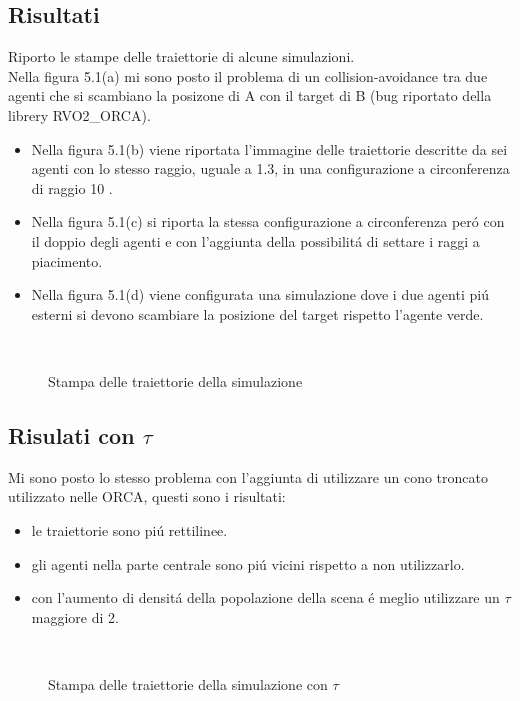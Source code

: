  \subsection{Risultati}
Riporto le stampe delle traiettorie di alcune simulazioni.\\
Nella figura 5.1(a) mi sono posto il problema di un collision-avoidance tra due agenti che si scambiano la posizone di A con il target di B (bug riportato della librery RVO2\_ORCA).
\begin{itemize}
\item Nella figura 5.1(b) viene riportata l'immagine delle traiettorie descritte da sei agenti con lo stesso raggio, uguale a 1.3, in una configurazione a circonferenza di raggio 10 .
\item Nella figura 5.1(c) si riporta la stessa configurazione a circonferenza per\'o con il doppio degli agenti e con l'aggiunta della possibilit\'a di settare i raggi a piacimento.
\item Nella figura 5.1(d) viene configurata una simulazione dove i due agenti pi\'u esterni si devono scambiare la posizione del target rispetto l'agente verde. 
\end{itemize}
\begin{figure}
\centering
{} \quad
{} \\
 \quad
{}
\caption[a,b,c,d dei risulati della simulazione]{Stampa delle traiettorie della simulazione}
\label{fig:}
\end{figure}
\newpage
\subsection{Risulati con $\tau$}
Mi sono posto lo stesso problema con l'aggiunta di utilizzare un cono troncato utilizzato nelle ORCA, questi sono i risultati:
\begin{itemize}
\item le traiettorie sono pi\'u rettilinee.
\item gli agenti nella parte centrale sono pi\'u vicini rispetto a non utilizzarlo.
\item con l'aumento di densit\'a della popolazione della scena \'e meglio utilizzare un $\tau$ maggiore di 2.
\end{itemize}



\begin{figure}
\centering
{} \quad
{} \\

\caption[a,b,c,d dei risulati della simulazione con $\tau$]{Stampa delle traiettorie della simulazione con $\tau$}
\label{fig:}
\end{figure}


